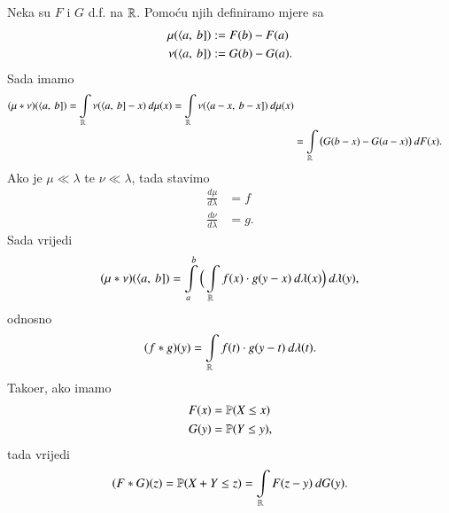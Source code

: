 \begin{rj}[\ref{zad:7.16}]
    Neka su $F$ i $G$ d.f. na $\mathbb{R}$.
    Pomo\' cu njih definiramo mjere sa
    \begin{equation*}
        \begin{aligned}
            \mu (\langle {a}, \: {b}]) &:= F(b) - F(a)\\
            \nu (\langle {a}, \: {b}]) &:= G(b) - G(a).
        \end{aligned}
    \end{equation*}
    Sada imamo
    \begin{equation*}
        \begin{aligned}
            (\mu * \nu) (\langle {a}, \: {b}]) = \int\limits_{\mathbb{R}} \nu (\langle {a}, \: {b}] - x) \: d \mu(x) = \int\limits_{\mathbb{R}} \nu (\langle {a - x}, \: {b - x}]) \: d  \mu (x)\\
            &= \int\limits_{\mathbb{R}} \big( G(b - x) - G(a - x) \big) \: d F (x).
        \end{aligned}
    \end{equation*}
    Ako je $\mu \ll \lambda$ te $\nu \ll \lambda$, tada stavimo
    \begin{equation*}
        \begin{aligned}
            \frac{d \mu}{d \lambda} &= f\\
            \frac{d \nu}{d \lambda} &= g.
        \end{aligned}
    \end{equation*}
    Sada vrijedi
    \begin{equation*}
        (\mu * \nu) (\langle {a}, \: {b}]) = \int\limits_a^b \Big( \int\limits_{\mathbb{R}} f(x) \cdot g (y - x) \: d \lambda (x) \Big) \: d \lambda (y),
    \end{equation*}
    odnosno
    \begin{equation*}
        (f * g) (y) = \int\limits_{\mathbb{R}} f(t) \cdot g(y - t) \: d \lambda (t).
    \end{equation*}
    Tako\dj er, ako imamo
    \begin{equation*}
        \begin{aligned}
            F (x) &= \mathbb{P} (X \leq x)\\
            G (y) &= \mathbb{P} (Y \leq y),
        \end{aligned}
    \end{equation*}
    tada vrijedi
    \begin{equation*}
        (F * G) (z) = \mathbb{P} (X + Y \leq z) = \int\limits_{\mathbb{R}} F(z - y) \: d G(y).
    \end{equation*}
\end{rj}

